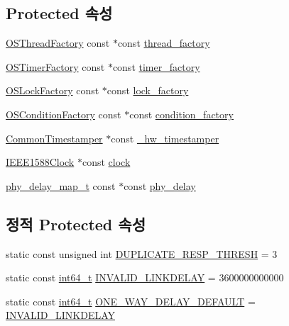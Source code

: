 \subsection*{Protected 속성}
\begin{DoxyCompactItemize}
\item 
\hyperlink{class_o_s_thread_factory}{O\+S\+Thread\+Factory} const $\ast$const \hyperlink{class_common_port_a2268fc1f22a57c22f52a6cd1a2d2c609}{thread\+\_\+factory}
\item 
\hyperlink{class_o_s_timer_factory}{O\+S\+Timer\+Factory} const $\ast$const \hyperlink{class_common_port_a0603401af06940a9018688e0030e68e5}{timer\+\_\+factory}
\item 
\hyperlink{class_o_s_lock_factory}{O\+S\+Lock\+Factory} const $\ast$const \hyperlink{class_common_port_a79c67e28bcaacaa0f11c04682d085b36}{lock\+\_\+factory}
\item 
\hyperlink{class_o_s_condition_factory}{O\+S\+Condition\+Factory} const $\ast$const \hyperlink{class_common_port_a91ea953f424f90ddff06dc5a6fa00fb1}{condition\+\_\+factory}
\item 
\hyperlink{class_common_timestamper}{Common\+Timestamper} $\ast$const \hyperlink{class_common_port_a6b964d49ce26b21cc984b14102973f87}{\+\_\+hw\+\_\+timestamper}
\item 
\hyperlink{class_i_e_e_e1588_clock}{I\+E\+E\+E1588\+Clock} $\ast$const \hyperlink{class_common_port_aa2bc8731fa5aeb5b033feebc2b67258c}{clock}
\item 
\hyperlink{common__port_8hpp_a3fdbc1f6eb18af9243571ba14c1e1f63}{phy\+\_\+delay\+\_\+map\+\_\+t} const $\ast$const \hyperlink{class_common_port_aa00ef04a42536f5b6a5086467cd1e968}{phy\+\_\+delay}
\end{DoxyCompactItemize}
\subsection*{정적 Protected 속성}
\begin{DoxyCompactItemize}
\item 
static const unsigned int \hyperlink{class_ether_port_a4bfdaa63b62521fdc6c49a731f007ae0}{D\+U\+P\+L\+I\+C\+A\+T\+E\+\_\+\+R\+E\+S\+P\+\_\+\+T\+H\+R\+E\+SH} = 3
\item 
static const \hyperlink{parse_8c_a67a9885ef4908cb72ce26d75b694386c}{int64\+\_\+t} \hyperlink{class_common_port_a12f51c79445b27ce04e3693f4d5093d7}{I\+N\+V\+A\+L\+I\+D\+\_\+\+L\+I\+N\+K\+D\+E\+L\+AY} = 3600000000000
\item 
static const \hyperlink{parse_8c_a67a9885ef4908cb72ce26d75b694386c}{int64\+\_\+t} \hyperlink{class_common_port_a1b98444ef2ff94e8f85b04c61cf42f56}{O\+N\+E\+\_\+\+W\+A\+Y\+\_\+\+D\+E\+L\+A\+Y\+\_\+\+D\+E\+F\+A\+U\+LT} = \hyperlink{class_common_port_a12f51c79445b27ce04e3693f4d5093d7}{I\+N\+V\+A\+L\+I\+D\+\_\+\+L\+I\+N\+K\+D\+E\+L\+AY}
\end{DoxyCompactItemize}
